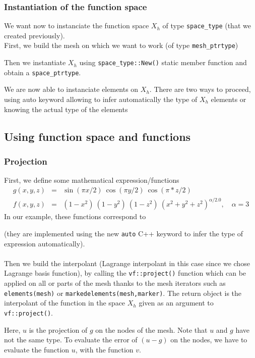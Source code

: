 \subsubsection{Instantiation of the function space}

We want now to instanciate the function space $X_h$ of type \lstinline!space_type! (that we created previously). \\

First, we build the mesh on which we want to work (of type \lstinline!mesh_ptrtype!)


Then we instantiate $X_h$ using \lstinline!space_type::New()! static member function and obtain a \lstinline!space_ptrtype!.

We are now able to instanciate elements on $X_h$. There are two ways to proceed, using auto keyword allowing to infer automatically the type of $ X_h$ elements or knowing the actual type of the elements


\subsection{Using function space and functions}
\subsubsection{Projection}

First, we define some mathematical expression/functions
\begin{eqnarray*}
g(x,y,z) &=& \sin(\pi x/2)\ \cos(\pi y/2)\ \cos(\pi*z/2) \\
f(x,y,z) &=& (1-x^2)\ (1-y^2)\ (1-z^2)\ (x^2+y^2+z^2)^{\alpha/2.0},\quad \alpha=3
\end{eqnarray*}
In our example, these functions correspond to

(they are implemented using the new \lstinline!auto! C++ keyword to infer the type of expression automatically). \\ \\
Then we build the interpolant (Lagrange interpolant in this case since we chose Lagrange basis function), by calling the \lstinline!vf::project()! function which can be applied on all or parts of the mesh thanks to the mesh iterators such as \lstinline!elements(mesh)! or \lstinline!markedelements(mesh,marker)!.
The return object is the interpolant of the function in the space $ X_h $ given as an argument to \lstinline!vf::project()!.

Here, $u$ is the projection of $g$ on the nodes of the mesh. Note that $u$ and $g$ have not the same type. To evaluate the error of $(u-g)$ on the nodes, we have to evaluate the function $u$, with the function $v$.

